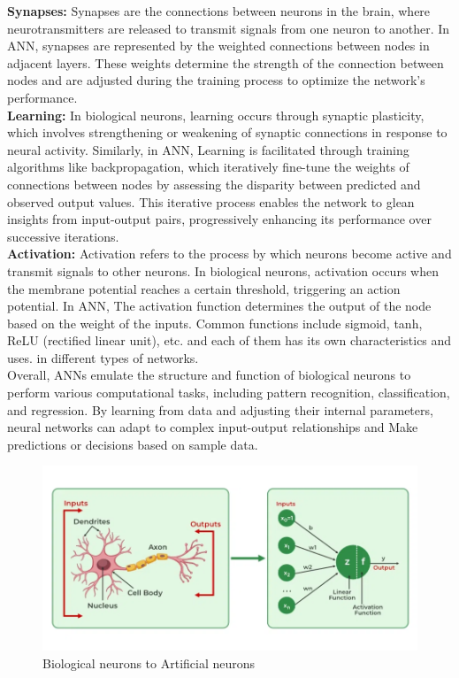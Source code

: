 \textbf{Synapses:}
Synapses are the connections between neurons in the brain, where neurotransmitters are released to transmit signals from one neuron to another. In ANN, synapses are represented by the weighted connections between nodes in adjacent layers. These weights determine the strength of the connection between nodes and are adjusted during the training process to optimize the network's performance.
\\
\textbf{Learning:} In biological neurons, learning occurs through synaptic plasticity, which involves strengthening or weakening of synaptic connections in response to neural activity. Similarly, in ANN, Learning is facilitated through training algorithms like backpropagation, which iteratively fine-tune the weights of connections between nodes by assessing the disparity between predicted and observed output values. This iterative process enables the network to glean insights from input-output pairs, progressively enhancing its performance over successive iterations.
\\
\textbf{Activation:} Activation refers to the process by which neurons become active and transmit signals to other neurons. In biological neurons, activation occurs when the membrane potential reaches a certain threshold, triggering an action potential. In ANN, The activation function determines the output of the node based on the weight of the inputs. Common functions include sigmoid, tanh, ReLU (rectified linear unit), etc. and each of them has its own characteristics and uses. in different types of networks.
\\
Overall, ANNs emulate the structure and function of biological neurons to perform various computational tasks, including pattern recognition, classification, and regression. By learning from data and adjusting their internal parameters, neural networks can adapt to complex input-output relationships and Make predictions or decisions based on sample data.
\\
 \begin{figure}[hbt!]
  \centering
 \includegraphics[width=0.9\linewidth]{C_chap/fig29.png}
     \caption{Biological neurons to Artificial neurons }
\end{figure}

